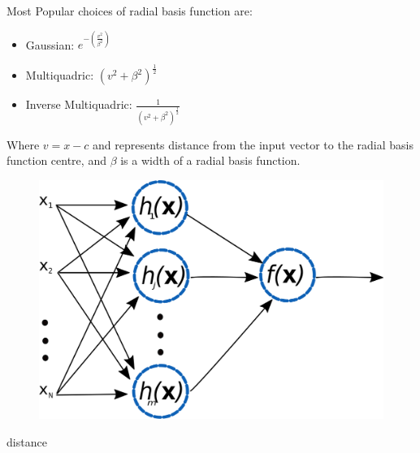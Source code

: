 Most Popular choices of radial basis function are: 
\begin{itemize}
  \item Gaussian: $e^{-(\frac{v^2}{\beta^2})}$ 
  \item Multiquadric:  $(v^2+\beta^2)^{\frac{1}{2}}$
  \item Inverse Multiquadric:  $\frac{1}{(v^2+\beta^2)^{\frac{1}{2}}}$
  \end{itemize}
Where $v=x-c$ and represents distance from the input vector to the radial basis function centre, and $\beta$ is a width of a radial basis function.
\begin{figure}[h!]
\centering
\includegraphics[width=1\textwidth]{figures/chap3/rbf.png}
\caption{}
\label{figure:rbf}
\end{figure}distance